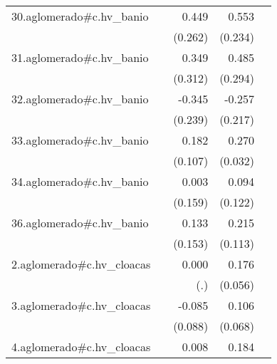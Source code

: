 {\begin{longtable}{l*{4}{D{.}{.}{-1}}}
\addlinespace
30.aglomerado#c.hv\_banio&                     &       0.449         &       0.553\sym{*}  &                     \\
            &                     &     (0.262)         &     (0.234)         &                     \\
\addlinespace
31.aglomerado#c.hv\_banio&                     &       0.349         &       0.485         &                     \\
            &                     &     (0.312)         &     (0.294)         &                     \\
\addlinespace
32.aglomerado#c.hv\_banio&                     &      -0.345         &      -0.257         &                     \\
            &                     &     (0.239)         &     (0.217)         &                     \\
\addlinespace
33.aglomerado#c.hv\_banio&                     &       0.182         &       0.270\sym{***}&                     \\
            &                     &     (0.107)         &     (0.032)         &                     \\
\addlinespace
34.aglomerado#c.hv\_banio&                     &       0.003         &       0.094         &                     \\
            &                     &     (0.159)         &     (0.122)         &                     \\
\addlinespace
36.aglomerado#c.hv\_banio&                     &       0.133         &       0.215         &                     \\
            &                     &     (0.153)         &     (0.113)         &                     \\
\addlinespace
2.aglomerado#c.hv\_cloacas&                     &       0.000         &       0.176\sym{**} &                     \\
            &                     &         (.)         &     (0.056)         &                     \\
\addlinespace
3.aglomerado#c.hv\_cloacas&                     &      -0.085         &       0.106         &                     \\
            &                     &     (0.088)         &     (0.068)         &                     \\
\addlinespace
4.aglomerado#c.hv\_cloacas&                     &       0.008         &       0.184\sym{***}&                     \\

\end{longtable}}
